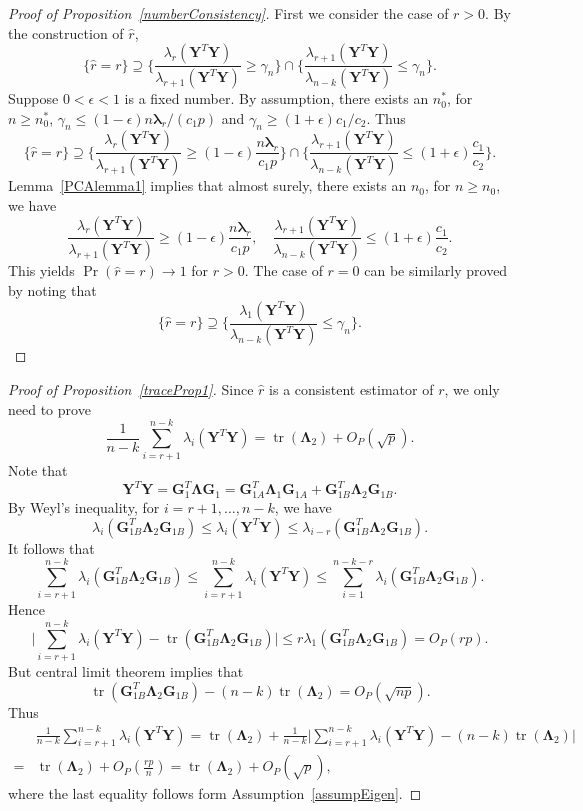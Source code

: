 \documentclass[12pt]{article} %
\DeclareMathOperator{\mytr}{tr}
\newcommand{\bY}{\mathbf{Y}}
\newcommand{\bG}{\mathbf{G}}
\newcommand{\bfsym}[1]{\ensuremath{\boldsymbol{#1}}}
\def\blambda {\bfsym {\lambda}}
\def\bLambda {\bfsym {\Lambda}}
\theoremstyle{definition}
\begin{document}
\begin{proof}[Proof of Proposition~\ref{numberConsistency}]
    First we consider the case of $r>0$. By the construction of $\hat{r}$,
    $$
    \{\hat{r}=r\}\supseteq 
    \{\frac{\lambda_{r}(\bY^T \bY)}{\lambda_{r+1}(\bY^T \bY)}\geq \gamma_n\}
    \cap
    \{\frac{\lambda_{r+1}(\bY^T \bY)}{\lambda_{n-k}(\bY^T \bY)}\leq \gamma_n\}.
    $$
    Suppose $0<\epsilon< 1$ is a fixed number.
    By assumption, there exists an $n_0^*$, for $n\geq n_0^*$, $\gamma_n\leq (1-\epsilon)n\blambda_r/(c_1 p)$ and $\gamma_n\geq (1+\epsilon) c_1/c_2 $. Thus
    $$
    \{\hat{r}=r\}\supseteq 
    \{\frac{\lambda_{r}(\bY^T \bY)}{\lambda_{r+1}(\bY^T \bY)}\geq (1-\epsilon)\frac{n\blambda_r}{c_1 p}\}
    \cap
    \{\frac{\lambda_{r+1}(\bY^T \bY)}{\lambda_{n-k}(\bY^T \bY)}\leq (1+\epsilon) \frac{c_1}{c_2} \}.
    $$
     Lemma~\ref{PCAlemma1} implies that almost surely, there exists an $n_0$, for $n\geq n_0$, we have
    $$\frac{\lambda_r(\bY^T \bY)}{\lambda_{r+1}(\bY^T \bY)}\geq (1-\epsilon)\frac{n\blambda_r}{c_1 p},
    \quad
    \frac{\lambda_{r+1}(\bY^T \bY)}{\lambda_{n-k}(\bY^T \bY)}\leq (1+\epsilon)\frac{c_1}{c_2}.
    $$
    This yields $\Pr(\hat{r}=r)\to 1$ for $r>0$.
    The case of $r=0$ can be similarly proved by noting that
    $$
    \{\hat{r}=r\}\supseteq 
    \{\frac{\lambda_{1}(\bY^T \bY)}{\lambda_{n-k}(\bY^T \bY)}\leq \gamma_n\}.
    $$
\end{proof}

\begin{proof}[Proof of Proposition~\ref{traceProp1}]
    Since $\hat{r}$ is a consistent estimator of $r$, we only need to prove
    $$
    \frac{1 }{n-k}
        \sum_{i=r+1}^{n-k}\lambda_i(\bY^T\bY)
        =\mytr(\bLambda_2)+O_P(\sqrt{p}).
    $$
    Note that
$$
\bY^T \bY =\bG_1^T \bLambda \bG_1
=
\bG_{1A}^T \bLambda_1 \bG_{1A}+
\bG_{1B}^T \bLambda_2 \bG_{1B}.
$$
By Weyl's inequality, for $i=r+1,\ldots, n-k$, we have
$$
\lambda_{i}(\bG_{1B}^T \bLambda_2 \bG_{1B})\leq \lambda_i(\bY^T \bY)\leq \lambda_{i-r}(\bG_{1B}^T \bLambda_2 \bG_{1B}).
$$
It follows that
$$
\sum_{i=r+1}^{n-k}\lambda_{i}(\bG_{1B}^T \bLambda_2 \bG_{1B})\leq \sum_{i=r+1}^{n-k}\lambda_i(\bY^T \bY)\leq \sum_{i=1}^{n-k-r}\lambda_{i}(\bG_{1B}^T \bLambda_2 \bG_{1B}).
$$
Hence
$$
 \big|\sum_{i=r+1}^{n-k}\lambda_i(\bY^T \bY)- \mytr(\bG_{1B}^T \bLambda_2 \bG_{1B})\big|\leq r \lambda_1(\bG_{1B}^T \bLambda_2 \bG_{1B})=O_P(rp).
$$
But central limit theorem implies that
$$\mytr(\bG_{1B}^T \bLambda_2 \bG_{1B})-(n-k)\mytr(\bLambda_2)%
=O_P(\sqrt{np}).$$
Thus
$$
    \begin{aligned}
        &\frac{1}{n-k}\sum_{i=r+1}^{n-k}\lambda_i (\bY^T \bY)
        =\mytr(\bLambda_2)+
\frac{1}{n-k}\big|\sum_{i=r+1}^{n-k}\lambda_i(\bY^T \bY)- (n-k)\mytr(\bLambda_2)\big|\\
        =&\mytr(\bLambda_2)+O_P(\frac{rp}{n})
        =\mytr(\bLambda_2)+O_P(\sqrt{p}),
    \end{aligned}
$$
    where the last equality follows form Assumption~\ref{assumpEigen}.
\end{proof}
\end{document}
